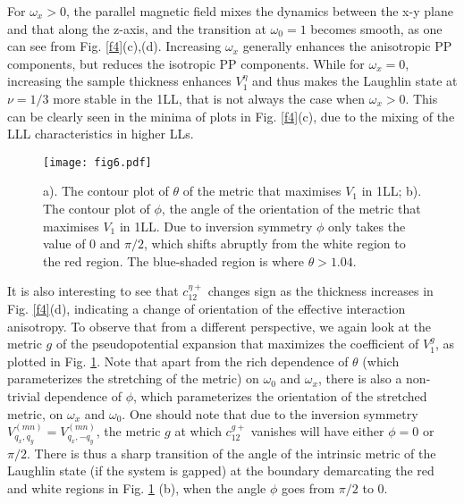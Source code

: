 \documentclass[twocolumn,showpacs,amsmath,amstex,amssymb,mathfonts,prb]{revtex4-1}
\begin{document}
For $\omega_x>0$, the parallel magnetic field mixes the dynamics between the x-y plane and that along the z-axis, and the transition at $\omega_0=1$ becomes smooth, as one can see from Fig. \ref{f4}(c),(d). Increasing $\omega_x$ generally enhances the anisotropic PP components, but reduces the isotropic PP components. While for $\omega_x=0$, increasing the sample thickness enhances $V^\eta_1$ and thus makes the Laughlin state at $\nu=1/3$ more stable in the 1LL, that is not always the case when $\omega_x>0$. This can be clearly seen in the minima of plots in Fig. \ref{f4}(c), due to the mixing of the LLL characteristics in higher LLs.  
\begin{figure}[htb]
\texttt{[image: fig6.pdf]}
\caption{a). The contour plot of $\theta$ of the metric that maximises $V_1$ in 1LL; b). The contour plot of $\phi$, the angle of the orientation of the metric that maximises $V_1$ in 1LL. Due to inversion symmetry $\phi$ only takes the value of $0$ and $\pi/2$, which shifts abruptly from the white region to the red region. The blue-shaded region is where $\theta>1.04$.}
\label{1LLmetric}
\end{figure}   

It is also interesting to see that $c^{\eta +}_{12}$ changes sign as the thickness increases in Fig. \ref{f4}(d), indicating a change of orientation of the effective interaction anisotropy. To observe that from a different perspective, we again look at the metric $g$ of the pseudopotential expansion that maximizes the coefficient of $V^g_1$, as plotted in Fig. \ref{1LLmetric}. Note that apart from the rich dependence of $\theta$ (which parameterizes the stretching of the metric) on $\omega_0$ and $\omega_x$, there is also a non-trivial dependence of $\phi$, which parameterizes the orientation of the stretched metric, on $\omega_x$ and $\omega_0$. One should note that due to the inversion symmetry $V^{\left(mn\right)}_{q_x,q_y}=V^{\left(mn\right)}_{q_x,-q_y}$, the metric $g$ at which $c^{g+}_{12}$ vanishes will have either $\phi=0$ or $\pi/2$. There is thus a sharp transition of the angle of the intrinsic metric of the Laughlin state (if the system is gapped) at the boundary demarcating the red and white regions in Fig. \ref{1LLmetric} (b), when the angle $\phi$ goes from $\pi/2$ to $0$.
\end{document}
